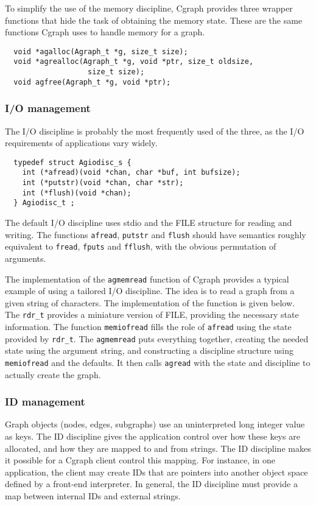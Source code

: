 \documentclass[11pt,letterpaper]{article}
\begin{document}
To simplify the use of the memory discipline, Cgraph provides three wrapper functions that hide the
task of obtaining the memory state. These are the same functions Cgraph uses to handle memory for a graph.
\begin{verbatim}
  void *agalloc(Agraph_t *g, size_t size);
  void *agrealloc(Agraph_t *g, void *ptr, size_t oldsize, 
                   size_t size);
  void agfree(Agraph_t *g, void *ptr);
\end{verbatim}

\subsubsection{I/O management}
The I/O discipline is probably the most frequently used of the three, as the I/O requirements of
applications vary widely. 
\begin{verbatim}
  typedef struct Agiodisc_s {
    int (*afread)(void *chan, char *buf, int bufsize);
    int (*putstr)(void *chan, char *str);
    int (*flush)(void *chan);
  } Agiodisc_t ;
\end{verbatim}
The default I/O discipline uses stdio and the FILE structure for reading and writing. The functions
\verb"afread", \verb"putstr" and \verb"flush" should have semantics roughly equivalent to 
\verb"fread", \verb"fputs" and \verb"fflush", with the obvious permutation of arguments.

The implementation of the \verb"agmemread" function of Cgraph provides a typical example of using
a tailored I/O discipline. The idea is to read a graph from a given string of characters. The 
implementation of the function is given below.
The \verb"rdr_t" provides a miniature version of FILE, providing the necessary state information.
The function \verb"memiofread" fills the role of \verb"afread" using the state provided by \verb"rdr_t".
The \verb"agmemread" puts everything together, creating the needed state using the argument string, 
and constructing a discipline structure using \verb"memiofread" and the defaults. It then calls
\verb"agread" with the state and discipline to actually create the graph.


\subsubsection{ID management}
Graph objects (nodes, edges, subgraphs) use an uninterpreted long integer value as keys.
The ID discipline gives the application control over how these keys are allocated, and how
they are mapped to and from strings.
The ID discipline makes it possible for a Cgraph client
control this mapping.  For instance, in one application, the client
may create IDs that are pointers into another object space defined by
a front-end interpreter.  In general, the ID discipline must provide
a map between internal IDs and external strings.  
\end{document}
